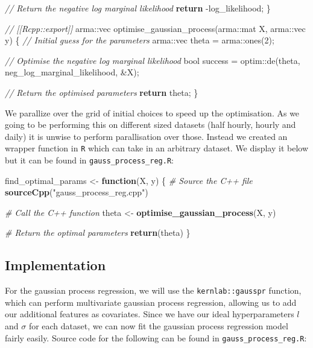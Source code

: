 \documentclass[
]{article}
\newenvironment{Shaded}{\begin{snugshade}}{\end{snugshade}}
\newcommand{\CommentTok}[1]{\textcolor[rgb]{0.56,0.35,0.01}{\textit{#1}}}
\newcommand{\ControlFlowTok}[1]{\textcolor[rgb]{0.13,0.29,0.53}{\textbf{#1}}}
\newcommand{\DataTypeTok}[1]{\textcolor[rgb]{0.13,0.29,0.53}{#1}}
\newcommand{\DecValTok}[1]{\textcolor[rgb]{0.00,0.00,0.81}{#1}}
\newcommand{\KeywordTok}[1]{\textcolor[rgb]{0.13,0.29,0.53}{\textbf{#1}}}
\newcommand{\NormalTok}[1]{#1}
\newcommand{\StringTok}[1]{\textcolor[rgb]{0.31,0.60,0.02}{#1}}
\begin{document}
\begin{Shaded}
\begin{Highlighting}[]
    \CommentTok{// Return the negative log marginal likelihood}
    \ControlFlowTok{return}\NormalTok{ {-}log\_likelihood;}
\NormalTok{\}}

\CommentTok{// [[Rcpp::export]]}
\NormalTok{arma::vec optimise\_gaussian\_process(arma::mat X, arma::vec y) \{}
    \CommentTok{// Initial guess for the parameters}
\NormalTok{    arma::vec theta = arma::ones(}\DecValTok{2}\NormalTok{);}

    \CommentTok{// Optimise the negative log marginal likelihood}
    \DataTypeTok{bool}\NormalTok{ success = optim::de(theta, neg\_log\_marginal\_likelihood, \&X);}

    \CommentTok{// Return the optimised parameters}
    \ControlFlowTok{return}\NormalTok{ theta;}
\NormalTok{\}}
\end{Highlighting}
\end{Shaded}

We parallize over the grid of initial choices to speed up the
optimisation. As we going to be performing this on different sized
datasets (half hourly, hourly and daily) it is unwise to perform
parallisation over those. Instead we created an wrapper function in
\texttt{R} which can take in an arbitrary dataset. We display it below
but it can be found in \texttt{gauss\_process\_reg.R}:

\begin{Shaded}
\begin{Highlighting}[]
\NormalTok{find\_optimal\_params \textless{}{-}}\StringTok{ }\ControlFlowTok{function}\NormalTok{(X, y) \{}
  \CommentTok{\# Source the C++ file}
  \KeywordTok{sourceCpp}\NormalTok{(}\StringTok{"gauss\_process\_reg.cpp"}\NormalTok{)}
  
  \CommentTok{\# Call the C++ function}
\NormalTok{  theta \textless{}{-}}\StringTok{ }\KeywordTok{optimise\_gaussian\_process}\NormalTok{(X, y)}
  
  \CommentTok{\# Return the optimal parameters}
  \KeywordTok{return}\NormalTok{(theta)}
\NormalTok{\}}
\end{Highlighting}
\end{Shaded}

\hypertarget{implementation-1}{%
\subsection{Implementation}\label{implementation-1}}

For the gaussian process regression, we will use the
\texttt{kernlab::gausspr} function, which can perform multivariate
gaussian process regression, allowing us to add our additional features
as covariates. Since we have our ideal hyperparameters \(l\) and
\(\sigma\) for each dataset, we can now fit the gaussian process
regression model fairly easily. Source code for the following can be
found in \texttt{gauss\_process\_reg.R}:
\end{document}
